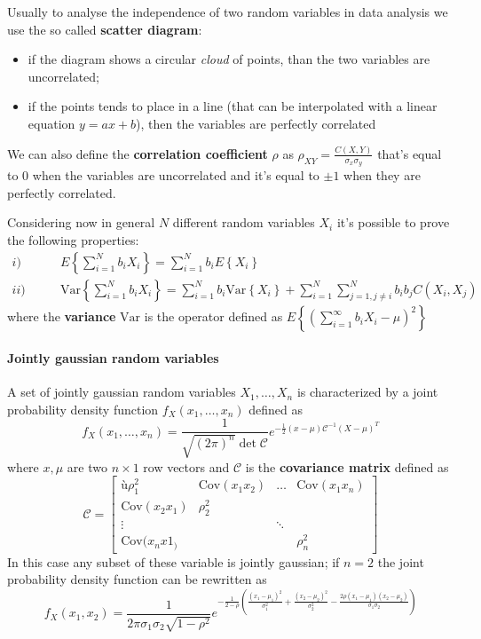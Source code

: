 	Usually to analyse the independence of two random variables in data analysis we use the so called \textbf{scatter diagram}:
	\begin{itemize}
		\item if the diagram shows a circular \textit{cloud} of points, than the two variables are uncorrelated;
		\item if the points tends to place in a line (that can be interpolated with a linear equation $y = ax + b$), then the variables are perfectly correlated 
	\end{itemize}
	We can also define the \textbf{correlation coefficient} $\rho$ as $\rho_{XY} = \frac{C(X,Y)}{\sigma_x \sigma_y}$ that's equal to 0 when the variables are uncorrelated and it's equal to $\pm 1$ when they are perfectly correlated.
	
	Considering now in general $N$ different random variables $X_i$ it's possible to prove the following properties:
	\begin{align*}
		i) & \qquad  E\left\{ \sum_{i=1}^N b_i X_i \right\} = \sum_{i=1}^N b_i E \left\{X_i\right\} \\
		ii)& \qquad \textrm{Var} \left\{ \sum_{i=1}^N b_i X_i \right\} = \sum_{i=1}^N b_i \textrm{Var} \left\{X_i\right\} + \sum_{i=1}^N\sum_{j=1,j\neq i}^N b_i b_j C(X_i,X_j) 
	\end{align*}
	where the \textbf{variance} $\textrm{Var}$ is the operator defined as $E\left\{\left(\sum_{i=1}^\infty b_i X_i - \mu \right)^2\right\}$
	
	\paragraph{Jointly gaussian random variables} A set of jointly gaussian random variables $X_1,\dots, X_n$ is characterized by a joint probability density function $f_X(x_1,\dots, x_n)$ defined as
	\[ f_X(x_1,\dots, x_n) = \frac{1}{\sqrt{(2\pi)^n} \det \mathcal C} e^{-\frac 12 (x-\mu)\mathcal C^{-1} (X-\mu)^T} \]
	where  $x,\mu$ are two $n\times 1$ row vectors and $\mathcal C$ is the \textbf{covariance matrix} defined as 
	\[ \mathcal C = \begin{bmatrix}ù
		\rho_1^2 & \textrm{Cov}(x_1x_2) & \dots & \textrm{Cov}(x_1x_n) \\
		 \textrm{Cov}(x_2x_1)  & \rho_2^2 \\
		 \vdots & & \ddots \\
		 \textrm{Cov}(x_nx1_) &&& \rho_n^2
	\end{bmatrix} \]
	In this case any subset of these variable is jointly gaussian; if $n=2$ the joint probability density function can be rewritten as
	\[ f_{X}(x_1,x_2) = \frac{1}{2\pi \sigma_1\sigma_2\sqrt{1-\rho^2}} e^{-\frac 1 {2 - \rho} \left( \frac{(x_1-\mu_1)^2}{\sigma_1^2} + \frac{(x_2-\mu_2)^2}{\sigma_2^2} - \frac{2\rho (x_1-\mu_1)(x_2-\mu_2)}{\sigma_1\sigma_2} \right) } \]
	
